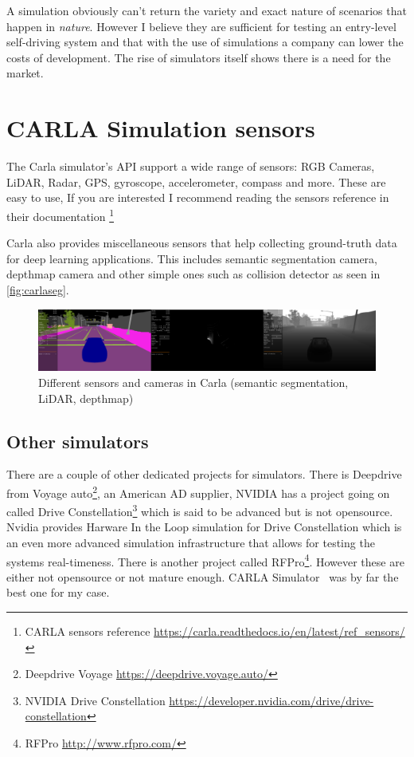 A simulation obviously can't return the variety and exact nature of scenarios
that happen in \emph{nature}. However I believe they are sufficient for testing
an entry-level self-driving system and that with the use of simulations a
company can lower the costs of development. The rise of simulators itself shows
there is a need for the market.

\section{CARLA Simulation sensors}

The Carla simulator's API support a wide range of sensors: RGB Cameras, LiDAR,
Radar, GPS, gyroscope, accelerometer, compass and more. These are easy to
use, If you are interested I recommend reading the sensors reference in their
documentation \footnote{CARLA sensors reference
\url{https://carla.readthedocs.io/en/latest/ref_sensors/}}

Carla also provides miscellaneous sensors that help collecting ground-truth data
for deep learning applications. This includes semantic segmentation camera,
depthmap camera and other simple ones such as collision detector as seen in \autoref{fig:carlaseg}.

\begin{figure}[!ht]
  \centering
  \includegraphics[width=150mm, keepaspectratio]{figures/carlaseg.png}
  \caption{Different sensors and cameras in Carla (semantic segmentation, LiDAR, depthmap)}
  \label{fig:carlaseg}
\end{figure}

\subsection{Other simulators}

There are a couple of other dedicated projects for simulators. There is
Deepdrive from Voyage auto\footnote{Deepdrive Voyage
\url{https://deepdrive.voyage.auto/}}, an American AD supplier, NVIDIA has a
project going on called Drive Constellation\footnote{NVIDIA Drive Constellation
\url{https://developer.nvidia.com/drive/drive-constellation}} which is said to
be advanced but is not opensource. Nvidia provides Harware In the Loop
simulation for Drive Constellation which is an even more advanced simulation
infrastructure that allows for testing the systems real-timeness. There is
another project called RFPro\footnote{RFPro \url{http://www.rfpro.com/}}.
However these are either not opensource or not mature enough. CARLA
Simulator~\cite{Dosovitskiy17} was by far the best one
for my case.